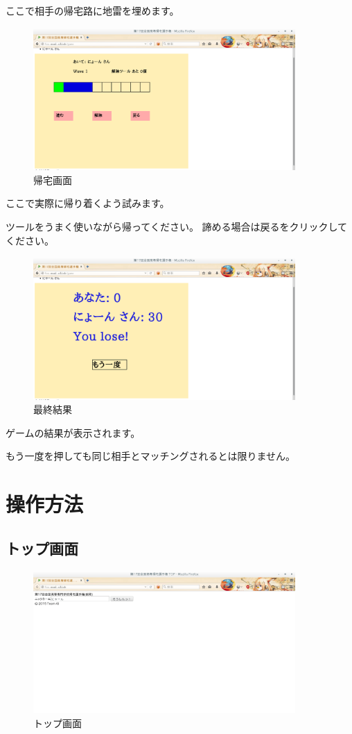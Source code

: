 \documentclass{jsarticle}
\begin{document}
ここで相手の帰宅路に地雷を埋めます。

\begin{figure}[htbp]
\centering
\includegraphics[width=10cm]{./do.png}
\caption{帰宅画面}
\end{figure}

ここで実際に帰り着くよう試みます。

ツールをうまく使いながら帰ってください。
諦める場合は戻るをクリックしてください。

\begin{figure}[htbp]
\centering
\includegraphics[width=10cm]{./result.png}
\caption{最終結果}
\end{figure}

ゲームの結果が表示されます。

もう一度を押しても同じ相手とマッチングされるとは限りません。

\section{操作方法}\label{ux64cdux4f5cux65b9ux6cd5}

\subsection{トップ画面}\label{ux30c8ux30c3ux30d7ux753bux9762}

\begin{figure}[htbp]
\centering
\includegraphics[width=10cm]{./top.png}
\caption{トップ画面}
\end{figure}
\end{document}
